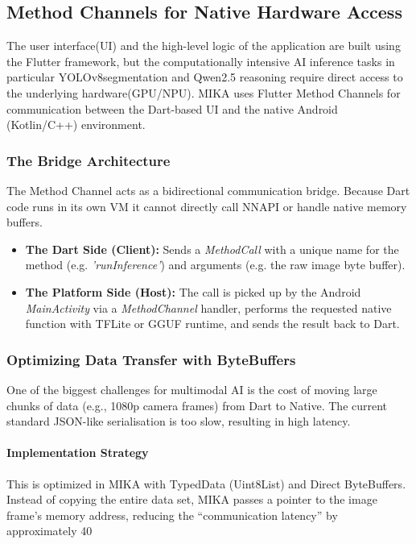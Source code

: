 \documentclass[12pt,a4paper]{report}
\begin{document}
\subsection{Method Channels for Native Hardware Access}
 
The user interface(UI) and the high-level logic of the application are built using the Flutter framework, but the computationally intensive AI inference tasks in particular YOLOv8segmentation and Qwen2.5 reasoning require direct access to the underlying hardware(GPU/NPU). MIKA uses Flutter Method Channels for communication between the Dart-based UI and the native Android (Kotlin/C++) environment.
 
\subsubsection{The Bridge Architecture}
The Method Channel acts as a bidirectional communication bridge. Because Dart code runs in its own VM it cannot directly call NNAPI or handle native memory buffers.

\begin{itemize}
    \item \textbf{The Dart Side (Client):} Sends a \textit{MethodCall} with a unique name for the method (e.g. \textit{'runInference'}) and arguments (e.g. the raw image byte buffer).
    \item \textbf{The Platform Side (Host):} The call is picked up by the Android \textit{MainActivity} via a \textit{MethodChannel} handler, performs the requested native function with TFLite or GGUF runtime, and sends the result back to Dart.
\end{itemize}
 
\subsubsection{Optimizing Data Transfer with ByteBuffers}
One of the biggest challenges for multimodal AI is the cost of moving large chunks of data (e.g., 1080p camera frames) from Dart to Native. The current standard JSON-like serialisation is too slow, resulting in high latency.

\paragraph{Implementation Strategy} This is optimized in MIKA with TypedData (Uint8List) and Direct ByteBuffers. Instead of copying the entire data set, MIKA passes a pointer to the image frame’s memory address, reducing the “communication latency” by approximately 40%
 
\end{document}
